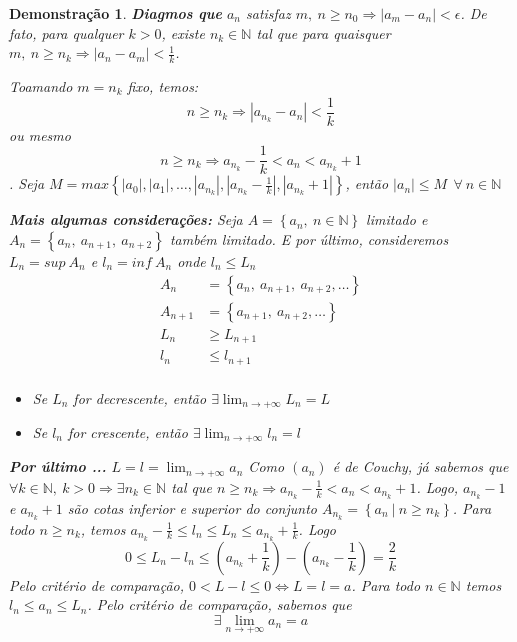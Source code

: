 \documentclass[12pt,openany]{book}
\newtheorem{demonstration}{Demonstração}
\begin{document}
\begin{demonstration}
\textbf{Diagmos que} $a_n$ satisfaz $m, \ n \geq n_0 \Rightarrow |a_m - a_n| < \epsilon$. De fato, para qualquer $k > 0$, existe $n_k \in \mathds{N}$ tal que para quaisquer $ m, \ n \geq n_k \Rightarrow |a_n - a_m| < \displaystyle{\frac{1}{k}}$.

Toamando $m = n_k$ fixo, temos: $$ n \geq n_k \Rightarrow |a_{n_k} - a_n| < \frac{1}{k} $$ ou mesmo $$ n \geq n_k \Rightarrow a_{n_k} - \frac{1}{k} < a_n < a_{n_k} + 1 $$. Seja $M = max\left\{ |a_0|, |a_1|, \hdots , |a_{n_k}|, |a_{n_k} - \frac{1}{k}|, |a_{n_k} + 1| \right\}$, então $|a_n| \leq M \ \ \forall \ n \in \mathds{N}$

\textbf{Mais algumas considerações:} Seja $A = \left\{ a_n, \ n \in \mathds{N} \right\}$ limitado e $A_n = \left\{ a_n, \ a_{n+1}, \ a_{n+2} \right\}$ também limitado. E por último, consideremos $L_n = sup \ A_n$ e $l_n = inf \ A_n$ onde $l_n \leq L_n$
\begin{align*}
A_n &= \left\{ a_n, \ a_{n+1}, \ a_{n+2}, \hdots \right\} \\
A_{n+1} &= \left\{ a_{n+1}, \ a_{n+2}, \hdots \right\} \\
L_n  &\geq L_{n+1} \\
l_n & \leq l_{n+1} \\
\end{align*}
\begin{itemize}
\item Se $L_n$ for decrescente, então $\displaystyle{\exists \lim_{n \rightarrow +\infty} L_n = L}$
\item Se $l_n$ for crescente, então $\displaystyle{\exists \lim_{n \rightarrow +\infty} l_n = l}$
\end{itemize}
\textbf{Por último ...} $\displaystyle{L = l = \lim_{n \rightarrow +\infty} a_n}$ Como $(a_n)$ é de Couchy, já sabemos que $\forall k \in \mathds{N}, \ k > 0 \Rightarrow \exists n_k \in \mathds{N}$ tal que $n \geq n_k \Rightarrow a_{n_k} - \frac{1}{k} < a_n < a_{n_k} + 1$. Logo, $a_{n_k} - 1 $ e $a_{n_k} + 1 $ são cotas inferior e superior do conjunto $A_{n_k} = \left\{ a_n \ | \ n \geq n_k \right\}$. Para todo $n \geq n_k$, temos $a_{n_k} - \frac{1}{k} \leq l_n \leq L_n \leq a_{n_k} + \frac{1}{k}$. Logo $$ 0 \leq L_n - l_n \leq (a_{n_k} + \frac{1}{k}) - (a_{n_k} - \frac{1}{k}) = \frac{2}{k}$$ Pelo critério de comparação, $ 0 < L - l \leq 0 \Longleftrightarrow L = l = a $. Para todo $n \in \mathds{N}$ temos $ l_n \leq a_n \leq L_n$. Pelo critério de comparação, sabemos que $$ \exists \lim_{n \rightarrow +\infty} a_n = a $$
\end{demonstration}
\end{document}
